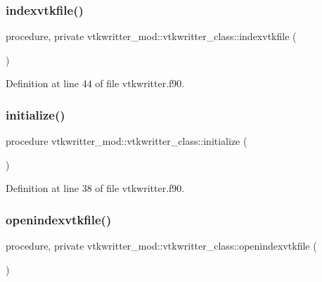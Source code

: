 \subsubsection{\texorpdfstring{indexvtkfile()}{indexvtkfile()}}
{\footnotesize\ttfamily procedure, private vtkwritter\+\_\+mod\+::vtkwritter\+\_\+class\+::indexvtkfile (\begin{DoxyParamCaption}{ }\end{DoxyParamCaption})\hspace{0.3cm}{\ttfamily [private]}}



Definition at line 44 of file vtkwritter.\+f90.

\mbox{\label{structvtkwritter__mod_1_1vtkwritter__class_ad74a863969884dacf4c8d9b96088c6a6}} 
\subsubsection{\texorpdfstring{initialize()}{initialize()}}
{\footnotesize\ttfamily procedure vtkwritter\+\_\+mod\+::vtkwritter\+\_\+class\+::initialize (\begin{DoxyParamCaption}{ }\end{DoxyParamCaption})\hspace{0.3cm}{\ttfamily [private]}}



Definition at line 38 of file vtkwritter.\+f90.

\mbox{\label{structvtkwritter__mod_1_1vtkwritter__class_aab225b4fa3f3cd814f2760fe79bd426c}} 
\subsubsection{\texorpdfstring{openindexvtkfile()}{openindexvtkfile()}}
{\footnotesize\ttfamily procedure, private vtkwritter\+\_\+mod\+::vtkwritter\+\_\+class\+::openindexvtkfile (\begin{DoxyParamCaption}{ }\end{DoxyParamCaption})\hspace{0.3cm}{\ttfamily [private]}}



